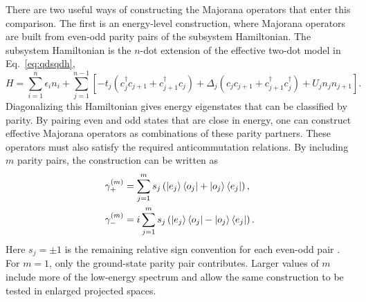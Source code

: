 There are two useful ways of constructing the Majorana operators that enter this comparison. The first is an energy-level construction, where Majorana operators are built from even-odd parity pairs of the subsystem Hamiltonian. The subsystem Hamiltonian is the $n$-dot extension of the effective two-dot model in Eq.~\ref{eq:qdsqdh},
\begin{equation}
  H =
  \sum_{i=1}^{n} \epsilon_i n_i
  +
  \sum_{j=1}^{n-1}
  \left[
  -t_j\left(c_j^\dagger c_{j+1}+c_{j+1}^\dagger c_j\right)
  +\Delta_j\left(c_j c_{j+1}+c_{j+1}^\dagger c_j^\dagger\right)
  +U_j n_j n_{j+1}
  \right].
  \label{eq:n_dot_hamiltonian}
\end{equation}
Diagonalizing this Hamiltonian gives energy eigenstates that can be classified by parity. By pairing even and odd states that are close in energy, one can construct effective Majorana operators as combinations of these parity partners. These operators must also satisfy the required anticommutation relations. By including $m$ parity pairs, the construction can be written as
\begin{equation}
  \begin{aligned}
      \gamma_{+}^{(m)} &= \sum_{j=1}^{m} s_j \left(\ket{e_j} \bra{o_j} + \ket{o_j} \bra{e_j}\right), \\
      \gamma_{-}^{(m)} &= i\sum_{j=1}^{m} s_j \left(\ket{e_j} \bra{o_j} - \ket{o_j} \bra{e_j}\right).
    \end{aligned}
    \label{eq:majorana_construction}
\end{equation}
Here $s_j=\pm1$ is the remaining relative sign convention for each even-odd pair \cite{samuelsonQuantifyingRobustnessLocality2026,kellsLocalizationEnhancedDegraded2018}. For $m=1$, only the ground-state parity pair contributes. Larger values of $m$ include more of the low-energy spectrum and allow the same construction to be tested in enlarged projected spaces.\\

